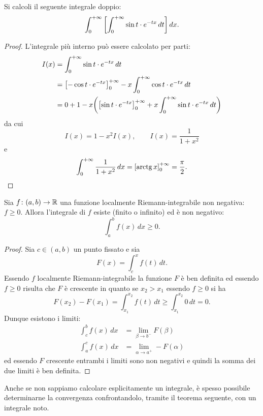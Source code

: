 \begin{exercise}\label{ex:821685}
  Si calcoli il seguente integrale doppio:
  \[
    \int_0^{+\infty} {\left[ \int_0^{+\infty} \sin t \cdot e^{-tx}\, dt \right]}\, dx.
  \]
\end{exercise}
%
\begin{proof}
L'integrale più interno può essere calcolato per parti:
\begin{align*}
  I(x) &= \int_0^{+\infty} \sin t\cdot e^{-tx}\, dt \\
  &=  {\left[ -\cos t \cdot e^{-tx} \right]}_0^{+\infty}
    - x \int_0^{+\infty} \cos t \cdot e^{-tx}\, dt \\
  &= 0 + 1 - x{\left( {\left[ \sin t \cdot e^{-tx} \right]}_0^{+\infty} 
  +x \int_0^{+\infty}\sin t \cdot e^{-tx}\, dt \right)}
\end{align*}
da cui 
\[
  I(x) = 1 - x^2 I(x), \qquad I(x) = \frac{1}{1+x^2}   
\]
e 
\[
 \int_0^{+\infty} \frac{1}{1+x^2}\, dx = {\left[ \operatorname{arctg} x \right]}_0^{+\infty} = \frac \pi 2.
\]
\end{proof}

\begin{theorem}
\label{th:integrabilita_positive}
\mymark{**}
Sia $f\colon (a,b)\to {\mathbb R}$ una funzione localmente Riemann-integrabile
non negativa: $f\ge 0$. Allora l'integrale di $f$ esiste (finito o infinito)
ed è non negativo:
\[
  \int_a^b f(x)\, dx \ge 0.
\]
\end{theorem}
%
\begin{proof}
\mymark{**}
Sia $c\in (a,b)$ un punto fissato e sia
\[
  F(x) = \int_c^x f(t)\, dt.
\]
Essendo $f$ localmente Riemann-integrabile la funzione $F$ è ben definita
ed essendo $f\ge 0$ risulta che $F$ è crescente in quanto se $x_2>x_1$
essendo $f\ge 0$ si ha
\[
  F(x_2)-F(x_1) = \int_{x_1}^{x_2} f(t)\, dt \ge \int_{x_1}^{x_2} 0\, dt = 0.
\]
Dunque esistono i limiti:
\begin{align*}
  \int_c^b f(x)\, dx  &= \lim_{\beta\to b^-} F(\beta)\\
  \int_a^c f(x)\, dx  &= \lim_{\alpha\to a^+} -F(\alpha)
\end{align*}
ed essendo $F$ crescente entrambi i limiti sono non negativi e quindi
la somma dei due limiti è ben definita.
\end{proof}

Anche se non sappiamo calcolare esplicitamente un integrale,
è spesso possibile determinarne la convergenza confrontandolo,
tramite il teorema seguente, con un integrale noto.

